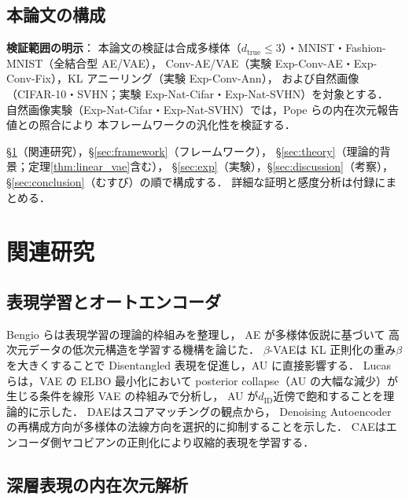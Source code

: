 \documentclass[11pt,a4paper]{jsarticle}
\begin{document}
\subsection{本論文の構成}\label{sec:intro_structure}

\textbf{検証範囲の明示}：
本論文の検証は合成多様体（$d_{\mathrm{true}} \leq 3$）・MNIST・Fashion-MNIST（全結合型 AE/VAE），
Conv-AE/VAE（実験 Exp-Conv-AE・Exp-Conv-Fix），KL アニーリング（実験 Exp-Conv-Ann），
および自然画像（CIFAR-10・SVHN；実験 Exp-Nat-Cifar・Exp-Nat-SVHN）を対象とする．
自然画像実験（Exp-Nat-Cifar・Exp-Nat-SVHN）では，Pope ら\cite{pope2021intrinsic}の内在次元報告値との照合により
本フレームワークの汎化性を検証する．

§\ref{sec:related}（関連研究），§\ref{sec:framework}（フレームワーク），
§\ref{sec:theory}（理論的背景；定理\ref{thm:linear_vae}含む），
§\ref{sec:exp}（実験），§\ref{sec:discussion}（考察），§\ref{sec:conclusion}（むすび）の順で構成する．
詳細な証明と感度分析は付録にまとめる．

\section{関連研究}\label{sec:related}

\subsection{表現学習とオートエンコーダ}\label{sec:related_ae}

Bengio ら\cite{bengio2013representation}は表現学習の理論的枠組みを整理し，
AE が多様体仮説\cite{fefferman2016manifold}に基づいて
高次元データの低次元構造を学習する機構を論じた．
$\beta$-VAE\cite{higgins2017betavae}は KL 正則化の重み$\beta$を大きくすることで
Disentangled 表現を促進し，AU に直接影響する．
Lucas ら\cite{lucas2019elbo}は，VAE の ELBO 最小化において
posterior collapse（AU の大幅な減少）が生じる条件を線形 VAE の枠組みで分析し，
AU が$d_{\mathrm{ID}}$近傍で飽和することを理論的に示した．
DAE\cite{alain2014dae}はスコアマッチングの観点から，
Denoising Autoencoder の再構成方向が多様体の法線方向を選択的に抑制することを示した．
CAE\cite{rifai2011cae}はエンコーダ側ヤコビアンの正則化により収縮的表現を学習する．

\subsection{深層表現の内在次元解析}\label{sec:related_id}
\end{document}
